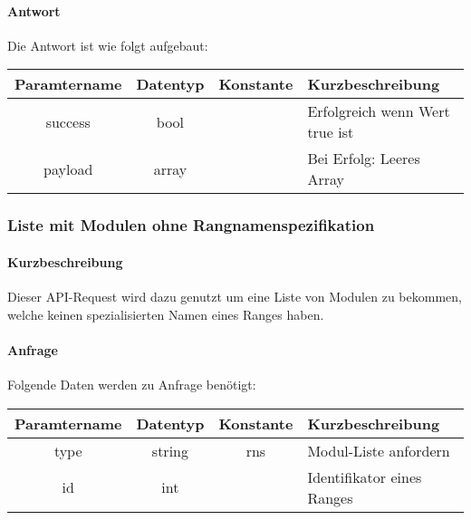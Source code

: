 \paragraph{Antwort}Die Antwort ist wie folgt aufgebaut:
\begin{table}[H]
	\begin{tabular}{|c|c|c|p{6.5cm}|}
		\hline
		\textbf{Paramtername} & \textbf{Datentyp} & \textbf{Konstante} & \textbf{Kurzbeschreibung}            \\ \hline                
		success             & bool             &                 & Erfolgreich wenn Wert {\glqq true\grqq} ist \\ \hline
		payload             & array            &                 & Bei Erfolg: Leeres Array \\ \hline
	\end{tabular}
\end{table}
\subsubsection{Liste mit Modulen ohne Rangnamenspezifikation}
\paragraph{Kurzbeschreibung}Dieser API-Request wird dazu genutzt um eine Liste von Modulen zu bekommen, welche keinen spezialisierten Namen eines Ranges haben.
\paragraph{Anfrage}Folgende Daten werden zu Anfrage benötigt:
\begin{table}[H]
	\begin{tabular}{|c|c|c|p{6.5cm}|}
		\hline
		\textbf{Paramtername} & \textbf{Datentyp} & \textbf{Konstante} & \textbf{Kurzbeschreibung}                                                                                               \\ \hline
		type                & string            & rns                & Modul-Liste anfordern \\ \hline
		id                  & int               &                    & Identifikator eines Ranges \\ \hline
	\end{tabular}
\end{table}
